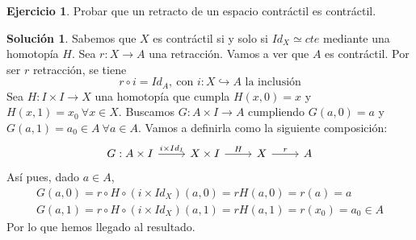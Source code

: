 \documentclass{article}
\theoremstyle{plain}
\theoremstyle{definition}
\newtheorem{exercise}{Ejercicio}
\newtheorem*{sol*}{Solución}
\begin{document}
\newpage
\begin{exercise}
Probar que un retracto de un espacio contráctil es contráctil.
\end{exercise}
\begin{sol*}
Sabemos que $X$ es contráctil si y solo si $Id_X\simeq cte$ mediante una homotopía $H$. Sea $r:X\to A$ una retracción. Vamos a ver que $A$ es contráctil. Por ser $r$ retracción, se tiene
\[
r\circ i =Id_A,\ \text{con }i: X\hookrightarrow A\text{ la inclusión}
\]
Sea $H:I\times I\to X$ una homotopía que cumpla $H(x,0)=x$ y $H(x,1)=x_0\ \forall x\in X$. Buscamos $G:A\times I\to A$ cumpliendo  $G(a,0)=a$ y $G(a,1)=a_0\in A\ \forall a\in A$. Vamos a definirla como la siguiente composición:
\[
\begin{tikzcd}
G: A\times I \arrow[r,"i\times Id_I"]& X\times I \arrow[r, "H"] &  X \arrow[r,"r"] & A 
\end{tikzcd}
\]
Así pues, dado $a\in A$,
\begin{gather*}
G(a,0)=r\circ H\circ (i\times Id_X)(a,0)=rH(a,0)=r(a)=a\\
G(a,1)=r\circ H\circ (i\times Id_X)(a,1)=rH(a,1)=r(x_0)=a_0\in A
\end{gather*}
Por lo que hemos llegado al resultado. 
\end{sol*}
\newpage
\end{document}
